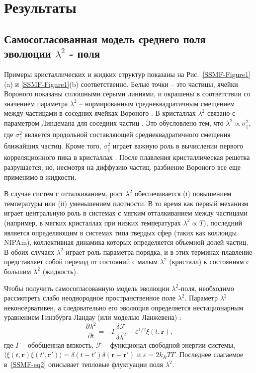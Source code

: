 \section{Результаты}
\subsection{Самосогласованная модель среднего поля эволюции $\lambda^2$ - поля}

Примеры кристаллических и жидких структур показаны на Рис.~\ref{SSMF-Figure1}(a) и \ref{SSMF-Figure1}(b) соответственно.
Белые точки -- это частицы, ячейки Вороного показаны сплошными серыми линиями, и окрашены в соответствии со значением параметра $\lambda^2$ -- нормированным среднеквадратичным смещением между частицами в соседних ячейках Вороного \cite{10.1021/acs.jpcc.7b09317}. %
В кристаллах $\lambda^2$ связано с параметром Линдемана для соседних частиц \cite{10.1016/0375-9601(85)90617-6}.
Это обусловлено тем, что $\lambda^2\propto \sigma_ \| ^ 2 $, где $ \sigma_ \| ^ 2 $ является продольной составляющей среднеквадратичного смещения ближайших частиц.
Кроме того, $ \sigma_ \| ^ 2 $ играет важную роль в вычислении первого корреляционного пика в кристаллах \cite{10.1063/1.4869863, 10.1063/1.4926945, 10.1088/0953-8984/28/23/235401, 10.1039/c7sm02429k, 10.1063/1.5116176}.
После плавления кристаллическая решетка разрушается, но, несмотря на диффузию частиц, разбиение Вороного все еще применимо в жидкости.

В случае систем с отталкиванием, рост $\lambda^2$ обеспечивается (i) повышением температуры или (ii) уменьшением плотности.
В то время как первый механизм играет центральную роль в системах с мягким отталкиванием между частицами (например, в мягких кристаллах при низких температурах $\lambda^2\propto T $), последний является определяющим в системах типа твердых сфер (таких как коллоиды NIPAm), коллективная динамика которых определяется объемной долей частиц.
В обоих случаях $\lambda^2$ играет роль параметра порядка, и в этих терминах плавление представляет собой переход от состояний с малым $\lambda^2$ (кристалл) к состояниям с большим $\lambda^2$ (жидкость).

Чтобы получить самосогласованную модель эволюции $ \lambda^2$-поля,
необходимо рассмотреть слабо неоднородное пространственное поле $\lambda^2$.
Параметр $\lambda ^ 2$ неконсервативен, а следовательно его эволюция определяется нестационарным уравнением Гинзбурга-Ландау (или моделью Ланжевена) \cite{book.desai}:
\begin{equation}
\label{SSMF-eq4}
\frac{\partial \lambda^2}{\partial t} = -\Gamma \frac{\delta \mathcal{F}}{\delta \lambda^2} + \varepsilon^{1/2}\xi(t,\mathbf{r}),
\end{equation}
где $\Gamma$ -- обобщенная вязкость, $ \mathcal{F} $ -- функционал свободной энергии системы, $\langle \xi(t,\mathbf{r})\xi(t',\mathbf{r}')\rangle = \delta(t-t')\delta(\mathbf{r}-\mathbf{r}')$ и $\varepsilon = 2k_BT\Gamma$.
Последнее слагаемое в~\eqref{SSMF-eq2} описывает тепловые флуктуации поля $\lambda^2$.

